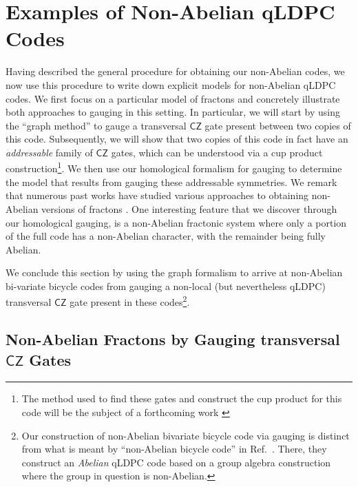 \documentclass[aps,prx,reprint,superscriptaddress,nofootinbib]{revtex4-2}
\theoremstyle{definition}
\newcommand{\<}{\langle}
\renewcommand{\>}{\rangle}
\begin{document}
\section{Examples of Non-Abelian qLDPC Codes}\label{sec:gauging-examples}

Having described the general procedure for obtaining our non-Abelian codes, we now use this procedure to write down explicit models for non-Abelian qLDPC codes.
%
We first focus on a particular model of fractons \cite{Shirley_2019,You_2018,Burnell_2022,Vijay_2016,Haah_2011,Gorantla_2023} and concretely illustrate both approaches to gauging in this setting.
%
%
In particular, we will start by using the ``graph method'' to gauge a transversal $\mathsf{CZ}$ gate present between two copies of this code.
%
Subsequently, we will show that two copies of this code in fact have an \textit{addressable} family of $\mathsf{CZ}$ gates, which can be understood via a cup product construction\footnote{The method used to find these gates and construct the cup product for this code will be the subject of a forthcoming work \cite{addressablegates}}.
%
We then use our homological formalism for gauging to determine the model that results from gauging these addressable symmetries.
%
We remark that numerous past works have studied various approaches to obtaining non-Abelian versions of fractons \cite{Bulmash_2019,Prem_2019,Wang_2020,Tu_2021,Williamson_2023}.
%
One interesting feature that we discover through our homological gauging, is a non-Abelian fractonic system where only a portion of the full code has a non-Abelian character, with the remainder being fully Abelian.


We conclude this section by using the graph formalism to arrive at non-Abelian bi-variate bicycle codes from gauging a non-local (but nevertheless qLDPC) transversal $\mathsf{CZ}$ gate present in these codes\footnote{Our construction of non-Abelian bivariate bicycle code via gauging is distinct from what is meant by ``non-Abelian bicycle code'' in Ref.~\cite{guo_toward_2026}.
%
There, they construct an \textit{Abelian} qLDPC code based on a group algebra construction where the group in question is non-Abelian.}.
%



\subsection{Non-Abelian Fractons by Gauging transversal $\mathsf{CZ}$ Gates}\label{subsec:graph-gauging-fracton}
\end{document}
